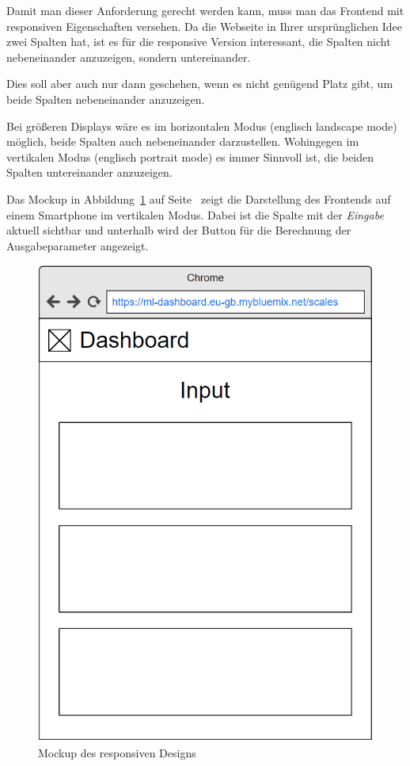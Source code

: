 Damit man dieser Anforderung gerecht werden kann, muss man das Frontend mit responsiven Eigenschaften versehen. Da die
Webseite in Ihrer ursprünglichen Idee zwei Spalten hat, ist es für die responsive Version interessant, die Spalten nicht
nebeneinander anzuzeigen, sondern untereinander.

Dies soll aber auch nur dann geschehen, wenn es nicht genügend Platz gibt, um beide Spalten nebeneinander anzuzeigen.

Bei größeren Displays wäre es im horizontalen Modus (englisch landscape mode) möglich, beide Spalten auch nebeneinander
darzustellen. Wohingegen im vertikalen Modus (englisch portrait mode) es immer Sinnvoll ist, die beiden Spalten
untereinander anzuzeigen.

Das Mockup in Abbildung~\ref{fig:umsetzung_mockup_scale_responsive} auf
Seite~\pageref{fig:umsetzung_mockup_scale_responsive} zeigt die Darstellung des Frontends auf einem Smartphone im
vertikalen Modus. Dabei ist die Spalte mit der \textit{Eingabe} aktuell sichtbar und unterhalb wird der Button für die
Berechnung der Ausgabeparameter angezeigt.

\begin{figure}[h]
    \centering
    \includegraphics[scale=0.45]{images/kapitel_4/mockup_scale_responsive.png}
    \caption{Mockup des responsiven Designs}
    \label{fig:umsetzung_mockup_scale_responsive}
\end{figure}

